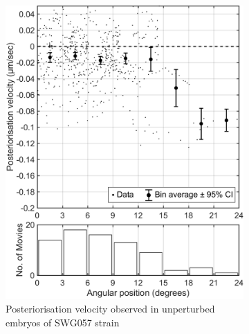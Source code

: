 \begin{figure}
\centering
\begin{subfigure}[t]{0.45\textwidth}
    \centering
    \includegraphics[width=\textwidth]{Results/FigExpGoa1Gpa16/wtPostVel.pdf}
    \caption{Posteriorisation velocity observed in unperturbed embryos of SWG057 strain} 
    \label{subfig:compareWtGoa1Gpa16PostVel-wt}
\end{subfigure}
\hfill
\begin{subfigure}[t]{0.45\textwidth}
    \centering

\end{subfigure}
\end{figure}
